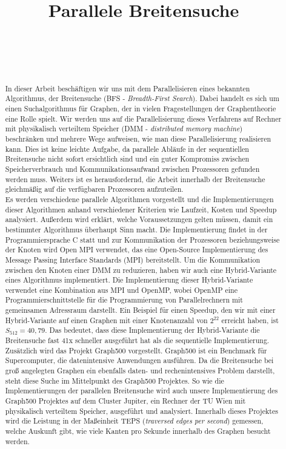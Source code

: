 \documentclass[11pt,a4paper]{article}
\title{Parallele Breitensuche}
\author{
 \authorname{Alexander Gallauner} \\
 \studentnumber{1026090} \\
 \curriculum{534} \\
 \email{alexander.gallauner@gmail.com}
}
\begin{document}
\maketitle
\begin{abstract}
In dieser Arbeit beschäftigen wir uns mit dem Parallelisieren eines bekannten Algorithmus, der Breitensuche (BFS - \textit{Breadth-First Search}). Dabei handelt es sich um einen Suchalgorithmus für Graphen, der in vielen Fragestellungen der Graphentheorie eine Rolle spielt. Wir werden uns auf die Parallelisierung dieses Verfahrens auf Rechner mit physikalisch verteiltem Speicher (DMM - \textit{distributed memory machine}) beschränken und mehrere Wege aufweisen, wie man diese Parallelisierung realisieren kann. Dies ist keine leichte Aufgabe, da parallele Abläufe in der sequentiellen Breitensuche nicht sofort ersichtlich sind und ein guter Kompromiss zwischen Speicherverbrauch und Kommunikationsaufwand zwischen Prozessoren gefunden werden muss. Weiters ist es herausfordernd, die Arbeit innerhalb der Breitensuche gleichmäßig auf die verfügbaren Prozessoren aufzuteilen.\\
Es werden verschiedene parallele Algorithmen vorgestellt und die Implementierungen dieser Algorithmen anhand verschiedener Kriterien wie Laufzeit, Kosten und Speedup analysiert. Außerdem wird erklärt, welche Voraussetzungen gelten müssen, damit ein bestimmter Algorithmus überhaupt Sinn macht. Die Implementierung findet in der Programmiersprache C statt und zur Kommunikation der Prozessoren beziehungsweise der Knoten wird Open MPI verwendet, das eine Open-Source Implementierung des Message Passing Interface Standards (MPI) bereitstellt. Um die Kommunikation zwischen den Knoten einer  DMM zu reduzieren, haben wir auch eine Hybrid-Variante eines Algorithmus implementiert. Die Implementierung dieser Hybrid-Variante verwendet eine Kombination aus MPI und OpenMP, wobei OpenMP eine Programmierschnittstelle für die Programmierung von Parallelrechnern mit gemeinsamen Adressraum darstellt. Ein Beispiel für einen Speedup, den wir mit einer Hybrid-Variante auf einen Graphen mit einer Knotenanzahl von \(2^{22}\) erreicht haben, ist \(S_{512} = 40,79\). Das bedeutet, dass diese Implementierung der Hybrid-Variante die Breitensuche fast 41x schneller ausgeführt hat als die sequentielle Implementierung.\\
Zusätzlich wird das Projekt Graph500 vorgestellt. Graph500 ist ein Benchmark für Supercomputer, die datenintensive Anwendungen ausführen. Da die Breitensuche bei groß angelegten Graphen ein ebenfalls daten- und rechenintensives Problem darstellt, steht diese Suche im Mittelpunkt des Graph500 Projektes. So wie die Implementierungen der parallelen Breitensuche wird auch unsere Implementierung des Graph500 Projektes auf dem Cluster Jupiter, ein Rechner der TU Wien mit physikalisch verteiltem Speicher, ausgeführt und analysiert. Innerhalb dieses Projektes wird die Leistung in der Maßeinheit TEPS (\textit{traversed edges per second}) gemessen, welche Auskunft gibt, wie viele Kanten pro Sekunde innerhalb des Graphen besucht werden.
\end{abstract}
\clearpage
\end{document}
